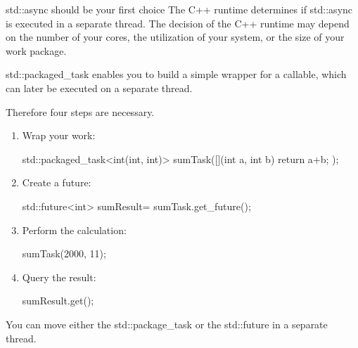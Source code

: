\begin{myTip}{std::async should be your first choice}
The C++ runtime determines if std::async is executed in a separate thread. The decision of the C++ runtime may depend on the number of your cores, the utilization of your system, or the size of your work package.
\end{myTip}


std::packaged\_task enables you to build a simple wrapper for a callable, which can later be executed on a separate thread.

Therefore four steps are necessary.

\begin{enumerate}[label=\Roman*.]
\item 
Wrap your work:

\begin{cpp}
std::packaged_task<int(int, int)> sumTask([](int a, int b){ return a+b; });
\end{cpp}

\item
Create a future:

\begin{cpp}
std::future<int> sumResult= sumTask.get_future();
\end{cpp}
 
\item 
Perform the calculation:

\begin{cpp}
sumTask(2000, 11);
\end{cpp}

\item 
Query the result:

\begin{cpp}
sumResult.get();
\end{cpp}

\end{enumerate}

You can move either the std::package\_task or the std::future in a separate thread.


